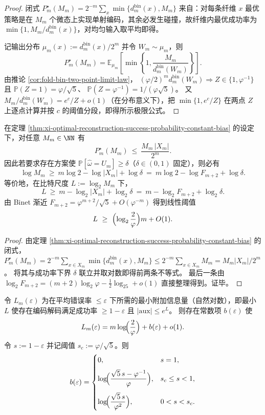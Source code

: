 \begin{proof}
闭式 \(P_m^\star(M_m)=2^{-m}\sum_x\min\{d_m^{\mathrm{bin}}(x),M_m\}\) 来自：对每条纤维 \(x\) 最优策略是在 \(M_m\) 个微态上实现单射编码，其余必发生碰撞，故纤维内最优成功率为 \(\min\{1,M_m/d_m^{\mathrm{bin}}(x)\}\)，对均匀输入取平均即得。
\par
记输出分布 \(\mu_m(x):=d_m^{\mathrm{bin}}(x)/2^m\) 并令 \(W_m\sim\mu_m\)，则
\[
P_m^\star(M_m)=\mathbb E_{\mu_m}\!\left[\min\!\left\{1,\frac{M_m}{d_m^{\mathrm{bin}}(W_m)}\right\}\right].
\]
由推论 \ref{cor:fold-bin-two-point-limit-law}，
\(
(\varphi/2)^m d_m^{\mathrm{bin}}(W_m)\Rightarrow Z\in\{1,\varphi^{-1}\}
\)
且
\(
\mathbb P(Z=1)=\varphi/\sqrt5
\)、
\(
\mathbb P(Z=\varphi^{-1})=1/(\varphi\sqrt5)
\)。
又 \(M_m/d_m^{\mathrm{bin}}(W_m)=e^{c}/Z+o(1)\)（在分布意义下），把 \(\min\{1,e^{c}/Z\}\) 在两点 \(Z\) 上逐点计算并按 \(c\) 的阈值分段，即得所示极限公式。
\end{proof}

\begin{corollary}[基数预算的强反界与线性阈值斜率]\label{cor:xi-reconstruction-cardinality-strong-converse}
在定理 \ref{thm:xi-optimal-reconstruction-success-probability-constant-bias} 的设定下，对任意 \(M_m\in\NN\) 有
\[
P_m^\star(M_m)\ \le\ \frac{M_m\,|X_m|}{2^m}.
\]
因此若要求存在方案使 \(\mathbb P[\widehat\omega=U_m]\ge \delta\)（\(\delta\in(0,1)\) 固定），则必有
\[
\log M_m\ \ge\ m\log 2-\log|X_m|+\log\delta
\ =\ m\log 2-\log F_{m+2}+\log\delta.
\]
等价地，在比特尺度 \(L:=\log_2 M_m\) 下，
\[
L\ \ge\ m-\log_2|X_m|+\log_2\delta
\ =\ m-\log_2F_{m+2}+\log_2\delta.
\]
由 Binet 渐近 \(F_{m+2}=\varphi^{m+2}/\sqrt5+O(\varphi^{-m})\) 得到线性阈值
\[
L\ \ge\ \Bigl(\log_2\frac{2}{\varphi}\Bigr)m+O(1).
\]
\end{corollary}
\begin{proof}
由定理 \ref{thm:xi-optimal-reconstruction-success-probability-constant-bias} 的闭式，
\(
P_m^\star(M_m)=2^{-m}\sum_{x\in X_m}\min\{d_m^{\mathrm{bin}}(x),M_m\}
\le 2^{-m}\sum_{x\in X_m}M_m
=M_m|X_m|/2^m
\)。
将其与成功率下界 \(\delta\) 联立并取对数即得前两条不等式。
最后一条由 \(\log_2F_{m+2}=(m+2)\log_2\varphi-\frac12\log_25+o(1)\) 直接整理得到。证毕。
\end{proof}

\begin{corollary}\label{cor:xi-constant-bias-inversion-b-eps}
令 \(L_m(\varepsilon)\) 为在平均错误率 \(\le\varepsilon\) 下所需的最小附加信息量（自然对数），即最小 \(L\) 使存在编码解码满足成功率 \(\ge 1-\varepsilon\) 且 \(|\mathrm{aux}|\le e^{L}\)。
则存在常数项 \(b(\varepsilon)\) 使
\[
L_m(\varepsilon)=m\log\!\Bigl(\frac{2}{\varphi}\Bigr)+b(\varepsilon)+o(1).
\]
令 \(s:=1-\varepsilon\) 并记阈值 \(s_c:=\varphi/\sqrt5\)。则
\[
b(\varepsilon)=
\begin{cases}
0, & s=1,\\[6pt]
\displaystyle \log\!\Bigl(\frac{\sqrt5\,s-\varphi^{-1}}{\varphi}\Bigr), & s_c\le s<1,\\[12pt]
\displaystyle \log\!\Bigl(\frac{\sqrt5\,s}{\varphi^2}\Bigr), & 0<s<s_c.
\end{cases}
\]
\end{corollary}

